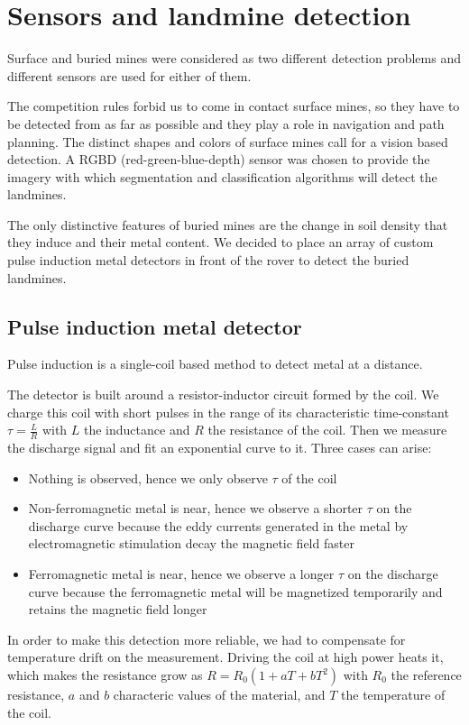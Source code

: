 \section{Sensors and landmine detection}
Surface and buried mines were considered as two different detection problems and different sensors are used for either of them.

The competition rules forbid us to come in contact surface mines, so they have to be detected from as far as possible and they play a role in navigation and path planning.
The distinct shapes and colors of surface mines call for a vision based detection.
A RGBD (red-green-blue-depth) sensor was chosen to provide the imagery with which segmentation and classification algorithms will detect the landmines.

The only distinctive features of buried mines are the change in soil density that they induce and their metal content.
We decided to place an array of custom pulse induction metal detectors in front of the rover to detect the buried landmines.

\subsection{Pulse induction metal detector}
Pulse induction is a single-coil based method to detect metal at a distance.

The detector is built around a resistor-inductor circuit formed by the coil.
We charge this coil with short pulses in the range of its characteristic time-constant $\tau = \frac{L}{R}$ with $L$ the inductance and $R$ the resistance of the coil.
Then we measure the discharge signal and fit an exponential curve to it.
Three cases can arise:
\begin{itemize}
    \item Nothing is observed, hence we only observe $\tau$ of the coil
    \item Non-ferromagnetic metal is near, hence we observe a shorter $\tau$ on the discharge curve because the eddy currents generated in the metal by electromagnetic stimulation decay the magnetic field faster
    \item Ferromagnetic metal is near, hence we observe a longer $\tau$ on the discharge curve because the ferromagnetic metal will be magnetized temporarily and retains the magnetic field longer
\end{itemize}
In order to make this detection more reliable, we had to compensate for temperature drift on the measurement.
Driving the coil at high power heats it, which makes the resistance grow as $R = R_0 (1 + a T + b T^2)$ with $R_0$ the reference resistance, $a$ and $b$ characteric values of the material, and $T$ the temperature of the coil.

